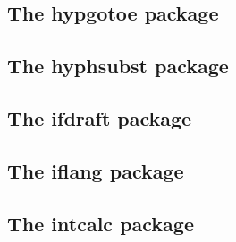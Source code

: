 \documentclass[a4paper,12pt]{article}
\makeatletter
\newcommand*{\xpackage}[1]{\textsf{#1}}
\newcommand*{\xoption}[1]{\textsf{#1}}
\newcommand*{\cs}[1]{\texttt{\textbackslash#1}}
\newcommand*{\tocinclude}[1]{%
  \setcounter{tocdepth}{3}%
  \begingroup
    \makeatletter
    \def\@prj{#1}%
    \let\contentsline\foreign@contentsline
  \endgroup
}
\def\foreign@contentsline#1#2#3#4{%
  \ifx\\#4\\%
    \csname l@#1\endcsname{#2}{#3}%
  \else
    \ifHy@linktocpage
      \csname l@#1\endcsname{{#2}}{%
        \hyper@linkfile{#3}{\@prj.pdf}{#4}%
      }%
    \else
      \csname l@#1\endcsname{%
        \hyper@linkfile{#2}{\@prj.pdf}{#4}%
      }{#3}%
    \fi
  \fi
}%
\newcommand*{\pkgsectformat}[1]{%
  \texorpdfstring{%
    \textcolor{link}{The} %
    \xpackage{#1} %
    \textcolor{link}{package}%
  }{#1}%
}
\makeatother
\begin{document}
\newpage
\subsection{\pkgsectformat{hypgotoe}}
\label{hypgotoe}
\begin{abstract}
Experimental package for links to embedded files.
\end{abstract}
\tocinclude{hypgotoe}

\newpage
\subsection{\pkgsectformat{hyphsubst}}
\label{hyphsubst}
\begin{abstract}
A \TeX\ format file may include alternative hyphenation patterns
for a language with a different name. If the naming convention
follows \xpackage{babel's} rules, then the hyphenation patterns
for a language can be replaced by the alternative hyphenation patterns,
provided in the format file.
\end{abstract}
\tocinclude{hyphsubst}

\newpage
\subsection{\pkgsectformat{ifdraft}}
\label{ifdraft}
\begin{abstract}
The package provides an interface for selecting code depending
on the options \xoption{draft} and \xoption{final}.
\end{abstract}
\tocinclude{ifdraft}

\newpage
\subsection{\pkgsectformat{iflang}}
\label{iflang}
\begin{abstract}
This package provides expandible checks for the current language
based on macro \cs{languagename} or hyphenation patterns.
\end{abstract}
\tocinclude{iflang}

\newpage
\subsection{\pkgsectformat{intcalc}}
\label{intcalc}
\begin{abstract}
This package provides expandable arithmetic operations
with integers.
\end{abstract}
\tocinclude{intcalc}
\end{document}
